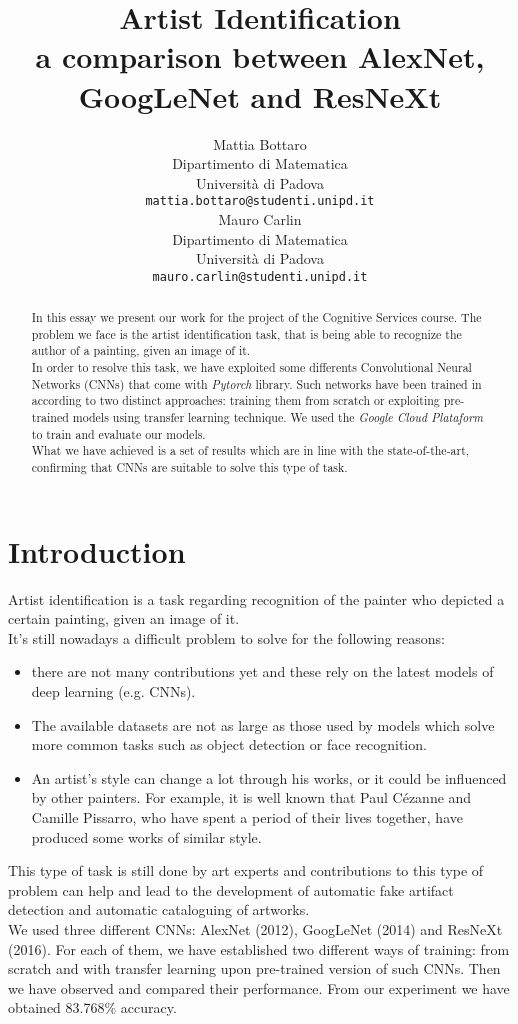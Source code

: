 \documentclass{article}
\title{Artist Identification	\\  a comparison between AlexNet, GoogLeNet and ResNeXt}
\author{
  Mattia Bottaro \\
  Dipartimento  di Matematica\\
  Università di Padova \\
  \texttt{mattia.bottaro@studenti.unipd.it} \\
   \And
  Mauro Carlin \\
Dipartimento  di Matematica\\
Università di Padova \\
\texttt{mauro.carlin@studenti.unipd.it} \\
}
\begin{document}
\maketitle

\begin{abstract}
	In this essay we present our work for the project of the Cognitive Services course.
	The problem we face is the artist identification task, that is being able to recognize the author of a painting, given an image of it.\\
	In order to resolve this task, we have exploited some differents Convolutional Neural Networks (CNNs) that come with \textit{Pytorch} library. Such networks have been trained in according to two distinct approaches: training them from scratch or exploiting pre-trained models using transfer learning technique. We used the \textit{Google Cloud Plataform} to train and evaluate our models.\\
	What we have achieved is a set of results which are in line with the  state-of-the-art, confirming that CNNs are suitable to solve this type of task.
\end{abstract}




\section{Introduction}
Artist identification is a task regarding recognition of the painter who depicted a certain painting, given an image of it.\\
It's still nowadays a difficult problem to solve for the following reasons:
\begin{itemize}
	\item there are not many contributions yet and these rely on the latest models of deep learning (e.g. CNNs). 
	\item The available datasets are not as large as those used by models which solve more common tasks such as object detection or face recognition.
	\item An artist's style can change a lot through his works, or it could be influenced by other painters. For example, it is well known that Paul Cézanne and Camille Pissarro, who have spent a period of their lives together, have produced some works of similar style.
\end{itemize}
This type of task is still done by art experts and contributions to this type of problem can help and lead to the development of automatic fake artifact detection and automatic cataloguing of artworks.\\
We used three different CNNs: AlexNet (2012), GoogLeNet (2014) and ResNeXt (2016). For each of them, we have established two different ways of training: from scratch and with transfer learning  upon pre-trained version of such CNNs. Then we have observed and compared their performance. From our experiment we have obtained 83.768\% accuracy.\\
\end{document}
